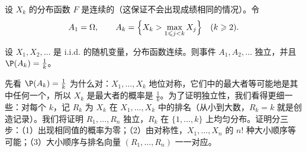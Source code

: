设 $X_k$ 的分布函数 $F$ 是连续的（这保证不会出现成绩相同的情况）。令
\[
A_1=\Omega,\qquad A_k=\Bigl\{X_k>\max_{1\leqslant j<k}X_j\Bigr\}\quad(k\geqslant2).
\]

\begin{theorem}\label{thm:independence:records}
设 $X_1,X_2,\dots$ 是 i.i.d. 的随机变量，分布函数连续。则事件 $A_1,A_2,\dots$ 独立，并且 $\P(A_k)=\frac1k$。
\end{theorem}

\begin{remark}[证明思路]
先看 $\P(A_k)=\frac1k$ 为什么对：$X_1,\dots,X_k$ 地位对称，它们中的最大者等可能地是其中任何一个，所以 $X_k$ 是最大者的概率是 $\frac1k$。为了证明独立性，我们看得更细一些：对每个 $k$，记 $R_k$ 为 $X_k$ 在 $X_1,\dots,X_k$ 中的排名（从小到大数，$R_k=k$ 就是创造记录）。我们将证明 $R_1,\dots,R_n$ 独立，$R_k$ 在 $\{1,\dots,k\}$ 上均匀分布。证明分三步：（1）出现相同值的概率为零；（2）由对称性，$X_1,\dots,X_n$ 的 $n!$ 种大小顺序等可能；（3）大小顺序与排名向量 $(R_1,\dots,R_n)$ 一一对应。
\end{remark}

